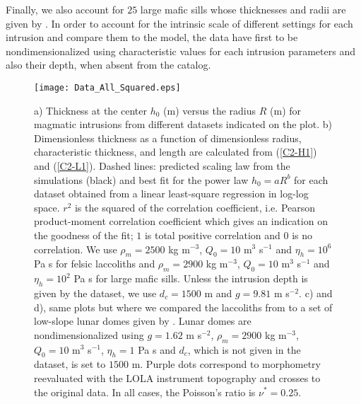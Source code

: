 Finally, we also account for  $25$ large mafic sills whose thicknesses
and radii are given by \citet{Cruden:tg}.  In order to account for the
intrinsic scale of  different settings for each  intrusion and compare
them to the model, the data  have first to be nondimensionalized using
characteristic  values for  each intrusion  parameters and  also their
depth, when absent from the catalog.

\begin{figure}[htpb]
  \begin{center}
    \graphicspath{ {/Users/thorey/Documents/These/Projet/Refroidissement/Skin_Model/Figure/Figure_Data/} }
    \texttt{[image: Data\_All\_Squared.eps]}
    \caption{a) Thickness  at the center  $h_0$ (m) versus  the radius
      $R$  (m)   for  magmatic  intrusions  from   different  datasets
      indicated on the plot. b)  Dimensionless thickness as a function
      of  dimensionless radius,  characteristic thickness,  and length
      are  calculated from  (\ref{C2-H1})  and (\ref{C2-L1}).   Dashed
      lines: predicted  scaling law  from the simulations  (black) and
      best fit for the power  law $h_0=aR^b$ for each dataset obtained
      from a  linear least-square regression in  log-log space.  $r^2$
      is  the squared  of the  correlation coefficient,  i.e.  Pearson
      product-moment correlation coefficient which gives an indication
      on the  goodness of the  fit; $1$ is total  positive correlation
      and $0$  is no correlation.   We use $\rho_m=2500$  kg m$^{-3}$,
      $Q_0  =10$ m$^3$  s$^{-1}$  and $\eta_h=10^6$  Pa  s for  felsic
      laccoliths  and  $\rho_m=2900$  kg  m$^{-3}$,  $Q_0  =10$  m$^3$
      s$^{-1}$ and $\eta_h=10^2$  Pa s for large  mafic sills.  Unless
      the intrusion depth is given by the dataset, we use $d_c=1500$ m
      and $g=9.81$  m s$^{-2}$.  c)  and d),  same plots but  where we
      compared the  laccoliths from \citet{Rocchi:2002jy} to  a set of
      low-slope  lunar domes  given  by \citet{Wohler:2009jj}.   Lunar
      domes   are  nondimensionalized   using  $g=1.62$   m  s$^{-2}$,
      $\rho_m=2900$ kg m$^{-3}$, $Q_0  =10$ m$^3$ s$^{-1}$, $\eta_h=1$
      Pa s  and $d_c$, which  is not given in  the dataset, is  set to
      $1500$ m. Purple dots correspond to morphometry reevaluated with
      the  LOLA  instrument topography  and  crosses  to the  original
      data. In all cases, the Poisson's ratio is $\nu^*=0.25$.}
    \label{C2-Corry_Rocchie}
  \end{center}
\end{figure}

